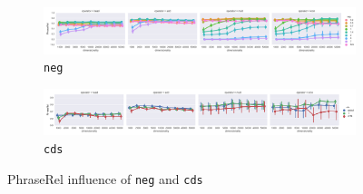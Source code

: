 \begin{figure}
  \centering

  \begin{subfigure}[t]{\textwidth}
    \includegraphics[width=1.1\textwidth]{supplement/figures/PhraseRel-interaction-neg}

  \caption{\texttt{neg}}
  \label{fig:phraserel-neg}
  \end{subfigure}

  \begin{subfigure}[t]{\textwidth}
    \includegraphics[width=1.1\textwidth]{supplement/figures/PhraseRel-interaction-cds}

  \caption{\texttt{cds}}
  \label{fig:phraserel-cds}
  \end{subfigure}

  \caption{PhraseRel influence of \texttt{neg} and \texttt{cds}}
\end{figure}
